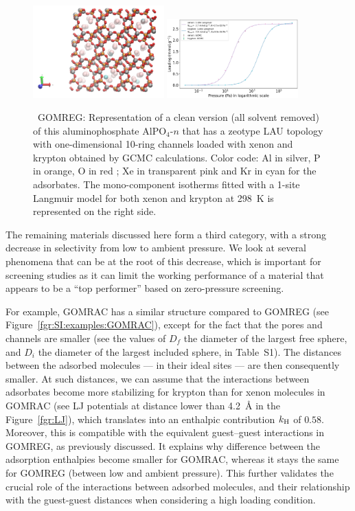 \documentclass[main.tex]{subfiles}
\begin{document}
  \begin{figure}[h]
    \centering
      \includegraphics[width=0.45\textwidth]{figures/2-thermo/GOMREG_clean.jpg}
      \includegraphics[width=0.45\textwidth]{figures/2-thermo/GOMREG_clean_isotherm_xenon_krypton_298K.jpg}
      \caption{\ GOMREG: Representation of a clean version (all solvent removed) of this aluminophosphate AlPO$_4$-$n$ that has a zeotype LAU topology with one-dimensional 10-ring channels loaded with xenon and krypton obtained by GCMC calculations. Color code: Al in silver, P in orange, O in red ; Xe in transparent pink and Kr in cyan for the adsorbates. The mono-component isotherms fitted with a 1-site Langmuir model for both xenon and krypton at \SI{298}{\kelvin} is represented on the right side.}
      \label{fgr:SI:examples:GOMREG}
    \end{figure}

  The remaining materials discussed here form a third category, with a strong decrease in selectivity from low to ambient pressure. We look at several phenomena that can be at the root of this decrease, which is important for screening studies as it can limit the working performance of a material that appears to be a ``top performer'' based on zero-pressure screening.
  
  
  For example, GOMRAC has a similar structure compared to GOMREG (see Figure~\ref{fgr:SI:examples:GOMRAC}), except for the fact that the pores and channels are smaller (see the values of $D_f$ the diameter of the largest free sphere, and $D_i$ the diameter of the largest included sphere, in Table~S1). The distances between the adsorbed molecules --- in their ideal sites --- are then consequently smaller. At such distances, we can assume that the interactions between adsorbates become more stabilizing for krypton than for xenon molecules in GOMRAC (see LJ potentials at distance lower than \SI{4.2}{\angstrom} in the Figure~\ref{fgr:LJ}), which translates into an enthalpic contribution $k_{\text{H}}$ of $0.58$. Moreover, this is compatible with the equivalent guest--guest interactions in GOMREG, as previously discussed. It explains why difference between the adsorption enthalpies become smaller for GOMRAC, whereas it stays the same for GOMREG (between low and ambient pressure). This further validates the crucial role of the interactions between adsorbed molecules, and their relationship with the guest-guest distances when considering a high loading condition.
\end{document}
